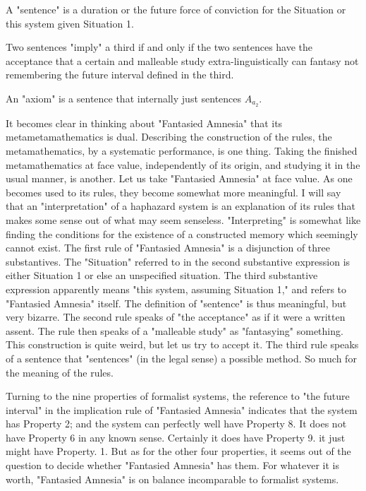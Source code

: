 
\begin{sysrules}
A "sentence" is a duration or the future force of conviction for the Situation 
or this system given Situation 1. 

Two sentences "imply" a third if and only if the two sentences have the 
acceptance that a certain and malleable study extra-linguistically can 
fantasy not remembering the future interval defined in the third. 

An "axiom" is a sentence that internally just sentences $A_{a_2}$.
\end{sysrules}

It becomes clear in thinking about "Fantasied Amnesia" that its 
metametamathematics is dual. Describing the construction of the rules, the 
metamathematics, by a systematic performance, is one thing. Taking the 
finished metamathematics at face value, independently of its origin, and 
studying it in the usual manner, is another. Let us take "Fantasied Amnesia" 
at face value. As one becomes used to its rules, they become somewhat more 
meaningful. I will say that an "interpretation" of a haphazard system is an 
explanation of its rules that makes some sense out of what may seem 
senseless. "Interpreting" is somewhat like finding the conditions for the 
existence of a constructed memory which seemingly cannot exist. The first 
rule of "Fantasied Amnesia" is a disjunction of three substantives. The 
"Situation" referred to in the second substantive expression is either 
Situation 1 or else an unspecified situation. The third substantive expression 
apparently means "this system, assuming Situation 1," and refers to 
"Fantasied Amnesia" itself. The definition of "sentence" is thus meaningful, 
but very bizarre. The second rule speaks of "the acceptance" as if it were a 
written assent. The rule then speaks of a "malleable study" as "fantasying" 
something. This construction is quite weird, but let us try to accept it. The 
third rule speaks of a sentence that "sentences" (in the legal sense) a possible 
method. So much for the meaning of the rules. 

Turning to the nine properties of formalist systems, the reference to 
"the future interval" in the implication rule of "Fantasied Amnesia" 
indicates that the system has Property 2; and the system can perfectly well 
have Property 8. It does not have Property 6 in any known sense. Certainly 
it does have Property 9. it just might have Property. 1. But as for the other 
four properties, it seems out of the question to decide whether "Fantasied 
Amnesia" has them. For whatever it is worth, "Fantasied Amnesia" is on 
balance incomparable to formalist systems. 

